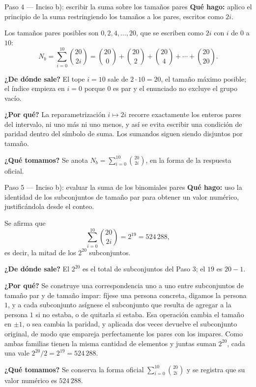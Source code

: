 \documentclass[11pt]{article}
\begin{document}
\begin{paso}{Paso 4 --- Inciso b): escribir la suma sobre los tamaños pares}
\textbf{Qué hago:} aplico el principio de la suma restringiendo los tamaños a los pares, escritos como $2i$.

Los tamaños pares posibles son $0,2,4,\dots,20$, que se escriben como $2i$ con $i$ de $0$ a $10$:
\[
  N_b=\sum_{i=0}^{10}\binom{20}{2i}=\binom{20}{0}+\binom{20}{2}+\binom{20}{4}+\cdots+\binom{20}{20}.
\]

\textbf{¿De dónde sale?} El tope $i=10$ sale de $2\cdot 10=20$, el tamaño máximo posible; el índice empieza en $i=0$ porque $0$ es par y el enunciado no excluye el grupo vacío.

\textbf{¿Por qué?} La reparametrización $i\mapsto 2i$ recorre exactamente los enteros pares del intervalo, ni uno más ni uno menos, y así se evita escribir una condición de paridad dentro del símbolo de suma. Los sumandos siguen siendo disjuntos por tamaño.

\textbf{¿Qué tomamos?} Se anota $N_b=\sum_{i=0}^{10}\binom{20}{2i}$, en la forma de la respuesta oficial.
\end{paso}

\begin{paso}{Paso 5 --- Inciso b): evaluar la suma de los binomiales pares}
\textbf{Qué hago:} uso la identidad de los subconjuntos de tamaño par para obtener un valor numérico, justificándola desde el conteo.

Se afirma que
\[
  \sum_{i=0}^{10}\binom{20}{2i} = 2^{19} = 524\,288 ,
\]
es decir, la mitad de los $2^{20}$ subconjuntos.

\textbf{¿De dónde sale?} El $2^{20}$ es el total de subconjuntos del Paso 3; el $19$ es $20-1$.

\textbf{¿Por qué?} Se construye una correspondencia uno a uno entre subconjuntos de tamaño par y de tamaño impar: fíjese una persona concreta, digamos la persona $1$, y a cada subconjunto asígnese el subconjunto que resulta de agregar a la persona $1$ si no estaba, o de quitarla si estaba. Esa operación cambia el tamaño en $\pm 1$, o sea cambia la paridad, y aplicada dos veces devuelve el subconjunto original, de modo que empareja perfectamente los pares con los impares. Como ambas familias tienen la misma cantidad de elementos y juntas suman $2^{20}$, cada una vale $2^{20}/2=2^{19}=524\,288$.

\textbf{¿Qué tomamos?} Se conserva la forma oficial $\sum_{i=0}^{10}\binom{20}{2i}$ y se registra que su valor numérico es $524\,288$.
\end{paso}
\end{document}
